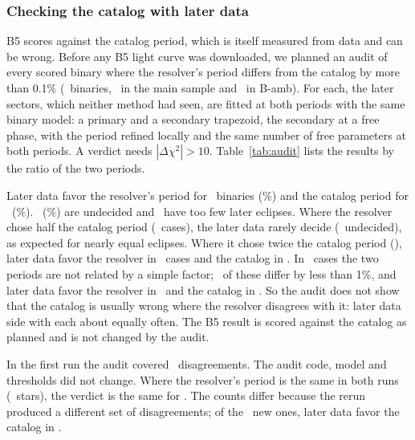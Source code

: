 \documentclass[twocolumn,linenumbers]{aastex701}
\begin{document}
\subsubsection{Checking the catalog with later data} \label{sec:audit}

B5 scores against the catalog period, which is itself measured from data and can be wrong. Before any B5 light curve was downloaded, we planned an audit of every scored binary where the resolver's period differs from the catalog by more than 0.1\% (\auditN\ binaries, \auditBN\ in the main sample and \auditAmbN\ in B-amb). For each, the later sectors, which neither method had seen, are fitted at both periods with the same binary model: a primary and a secondary trapezoid, the secondary at a free phase, with the period refined locally and the same number of free parameters at both periods. A verdict needs $|\Delta\chi^2|>10$. Table~\ref{tab:audit} lists the results by the ratio of the two periods.

Later data favor the resolver's period for \auditVtwo\ binaries (\auditVtwoPc\%) and the catalog period for \auditCat\ (\auditCatPc\%). \auditInc\ (\auditIncPc\%) are undecided and \auditIns\ have too few later eclipses. Where the resolver chose half the catalog period (\auditHalfN\ cases), the later data rarely decide (\auditHalfInc\ undecided), as expected for nearly equal eclipses. Where it chose twice the catalog period (\auditDoubleN), later data favor the resolver in \auditDoubleVtwo\ cases and the catalog in \auditDoubleCat. In \auditNonaliasN\ cases the two periods are not related by a simple factor; \auditNonaliasClose\ of these differ by less than 1\%, and later data favor the resolver in \auditNonaliasVtwo\ and the catalog in \auditNonaliasCat. So the audit does not show that the catalog is usually wrong where the resolver disagrees with it: later data side with each about equally often. The B5 result is scored against the catalog as planned and is not changed by the audit.

In the first run the audit covered \auditFirstN\ disagreements. The audit code, model and thresholds did not change. Where the resolver's period is the same in both runs (\auditSamePeriod\ stars), the verdict is the same for \auditSameVerdict. The counts differ because the rerun produced a different set of disagreements; of the \auditOnlyNewN\ new ones, later data favor the catalog in \auditOnlyNewCat.
\end{document}
